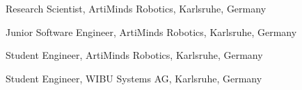 \documentclass[11pt]{article} %
\begin{document}
Research Scientist, ArtiMinds Robotics, Karlsruhe, Germany

\medskip

Junior Software Engineer, ArtiMinds Robotics, Karlsruhe, Germany

\medskip

Student Engineer, ArtiMinds Robotics, Karlsruhe, Germany

\medskip

Student Engineer, WIBU Systems AG, Karlsruhe, Germany


\nocite{*}
\setlength{\bibitemsep}{0pt} %
\setlength{\bibparsep}{0pt} %
\setlength{\bibhang}{0pt}   %

\newcommand{\firstpubentries}[2]{%
  \defbibcheck{#1}{\iffieldequalstr{year}{#1}{}{\skipentry}}%
  \years{#1}\vspace{0pt}\printbibliography[type=#2,heading=none,check=#1]
}

\newcommand{\pubentries}[2]{%
  \defbibcheck{#1}{\iffieldequalstr{year}{#1}{}{\skipentry}}%
  \years{#1}\vspace{-10pt}\printbibliography[type=#2,heading=none,check=#1]
}

\newcommand{\firstconfentries}[1]{%
  \defbibcheck{conf#1}{\iffieldequalstr{year}{#1}{}{\skipentry}\ifkeyword{workshop}{\skipentry}{}}%
  \years{#1}\vspace{0pt}\printbibliography[type=inproceedings,heading=none,check=conf#1]
}

\newcommand{\confentries}[1]{%
  \defbibcheck{conf#1}{\iffieldequalstr{year}{#1}{}{\skipentry}\ifkeyword{workshop}{\skipentry}{}}%
  \years{#1}\vspace{-10pt}\printbibliography[type=inproceedings,heading=none,check=conf#1]
}

\newcommand{\firstworkshopentries}[1]{%
  \defbibcheck{ws#1}{\iffieldequalstr{year}{#1}{}{\skipentry}\ifkeyword{workshop}{}{\skipentry}}%
  \years{#1}\vspace{0pt}\printbibliography[type=inproceedings,heading=none,check=ws#1]
}
\end{document}
